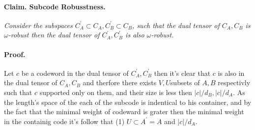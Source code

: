 \documentclass{article}
\begin{document}
\begin{multicols*}{2}
 \paragraph{Claim. Subcode Robusstness.} \textit{ Consider the subspaces $C_{A}^{\prime}\subset C_{A}, C_{B}^{\prime}\subset C_{B}$, such that the dual tensor of $C_{A}, C_{B}$ is $\omega$-robust then the dual tensor of $C_{A}^{\prime}, C_{B}^{\prime}$ is also $\omega$-robust.} 
\paragraph{Proof.} Let $c$ be a codeword in the dual tensor of $C_{A}^{\prime},C_{B}^{\prime}$ then it's clear that $c$ is also in the dual tensor of $C_{A}, C_{B}$ and therfore there exists $V,U$subsets of $A,B$ respectivly such that $c$ supported only on them, and their size is less then $|c|/d_{B}, |c|/d_{A}$. As the length's space of the each of the subcode is indentical to his container, and by the fact that the minimal weight of codeward is grater then the minimal weight in the containig code it's follow that (1) $U \subset A^\prime = A $ and $|c|/d_{A}$. 
\end{multicols*}
\end{document}
